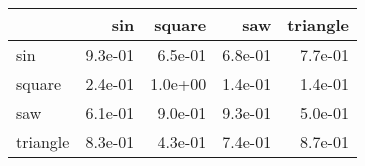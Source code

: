 \begin{tabular}{lrrrr}
\toprule
{} &     sin &  square &     saw &  triangle \\
\midrule
sin      & 9.3e-01 & 6.5e-01 & 6.8e-01 &   7.7e-01 \\
square   & 2.4e-01 & 1.0e+00 & 1.4e-01 &   1.4e-01 \\
saw      & 6.1e-01 & 9.0e-01 & 9.3e-01 &   5.0e-01 \\
triangle & 8.3e-01 & 4.3e-01 & 7.4e-01 &   8.7e-01 \\
\bottomrule
\end{tabular}
